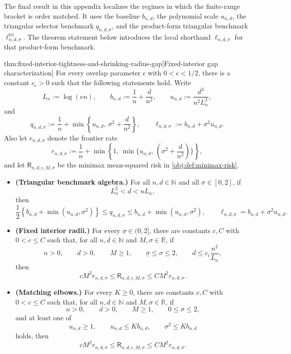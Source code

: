 \documentclass[11pt]{article}
\begin{document}
The final result in this appendix localizes the regimes in which the finite-range bracket is order matched. It uses the baseline \(b_{n,d}\), the polynomial scale \(u_{n,d}\), the triangular selector benchmark \(q_{n,d,\sigma}\), and the product-form triangular benchmark \(\ell^{\mathrm{tri}}_{n,d,\sigma}\). The theorem statement below introduces the local shorthand \(\ell_{n,d,\sigma}\) for that product-form benchmark.

\begin{theoremv}{thm:fixed-interior-tightness-and-shrinking-radius-gap}[Fixed-interior gap characterization]
For every overlap parameter \(\epsilon\) with \(0<\epsilon<1/2\), there is a constant \(c_\epsilon>0\) such that the following statements hold.  Write
\[
L_n:=\log(en),\qquad
b_{n,d}:=\frac1n+\frac d{n^2},\qquad
u_{n,d}:=\frac{d^2}{n^2L_n^2},
\]
and
\[
q_{n,d,\sigma}:=\frac1n+\min\left\{u_{n,d},\,\sigma^2+\frac d{n^2}\right\},
\qquad
\ell_{n,d,\sigma}:=b_{n,d}+\sigma^2u_{n,d}.
\]
Also let \(r_{n,d,\sigma}\) denote the frontier rate
\[
r_{n,d,\sigma}:=\frac1n+\min\left\{1,\,\min\{u_{n,d},\,\left(\sigma^2+\frac d{n^2}\right)\}\right\},
\]
and let \(\mathsf R_{n,d,\epsilon,M,\sigma}\) be the minimax mean-squared risk in \cref{obj:def:minimax-risk}.

\begin{itemize}
\item \textbf{(Triangular benchmark algebra.)}  For all \(n,d\in\mathbb N\) and all \(\sigma\in[0,2]\), if
\[
L_n^2<d<nL_n,
\]
then
\[
\frac12\left\{b_{n,d}+\min(u_{n,d},\sigma^2)\right\}
\le q_{n,d,\sigma}
\le b_{n,d}+\min(u_{n,d},\sigma^2),
\qquad
\ell_{n,d,\sigma}=b_{n,d}+\sigma^2u_{n,d}.
\]

\item \textbf{(Fixed interior radii.)}  For every \(\underline\sigma\in(0,2]\), there are constants \(c,C\) with \(0<c\le C\) such that, for all \(n,d\in\mathbb N\) and \(M,\sigma\in\mathbb R\), if
\[
n>0,\qquad d>0,\qquad M\ge1,\qquad
\underline\sigma\le\sigma\le2,\qquad
d\le c_\epsilon\frac{n^2}{L_n},
\]
then
\[
cM^2r_{n,d,\sigma}
\le
\mathsf R_{n,d,\epsilon,M,\sigma}
\le
CM^2r_{n,d,\sigma}.
\]

\item \textbf{(Matching elbows.)}  For every \(K\ge0\), there are constants \(c,C\) with \(0<c\le C\) such that, for all \(n,d\in\mathbb N\) and \(M,\sigma\in\mathbb R\), if
\[
n>0,\qquad d>0,\qquad M\ge1,\qquad 0\le\sigma\le2,
\]
and at least one of
\[
u_{n,d}\ge1,\qquad
u_{n,d}\le Kb_{n,d},\qquad
\sigma^2\le Kb_{n,d}
\]
holds, then
\[
cM^2r_{n,d,\sigma}
\le
\mathsf R_{n,d,\epsilon,M,\sigma}
\le
CM^2r_{n,d,\sigma}.
\]


\end{itemize}
\end{theoremv}
\end{document}
